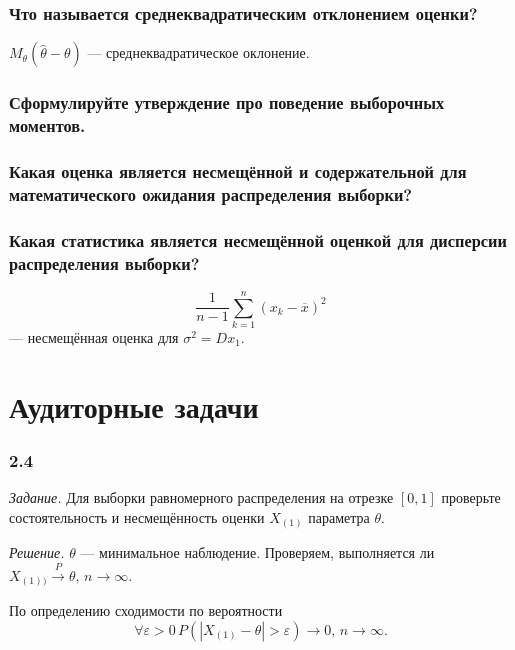 \subsubsection*{Что называется среднеквадратическим отклонением оценки?}

$M_{ \theta } \left( \hat{ \theta } - \theta \right) $ --- среднеквадратическое оклонение.

\subsubsection*{Сформулируйте утверждение про поведение выборочных моментов.}

\subsubsection*{Какая оценка является несмещённой и содержательной для математического ожидания
                распределения выборки?}

\subsubsection*{Какая статистика является несмещённой оценкой для дисперсии распределения выборки?}

$$ \frac{1}{n - 1} \sum \limits_{k = 1}^n \left( x_k - \overline{x} \right)^2$$
--- несмещённая оценка для $ \sigma^2 = Dx_1$.

\section*{Аудиторные задачи}

\subsubsection*{2.4}

\textit{Задание.}
Для выборки равномерного распределения на отрезке $ \left[ 0, 1 \right] $
проверьте состоятельность и несмещённость оценки $X_{ \left( 1 \right) }$ параметра $ \theta $.

\textit{Решение.} $ \theta $ --- минимальное наблюдение.
Проверяем,
выполняется ли $X_{ \left( 1 \right) )} \overset{P}{ \rightarrow } \theta, \, n \to \infty $.

По определению сходимости по вероятности
$$ \forall \varepsilon > 0 \,
  P \left( \left| X_{ \left( 1 \right) } - \theta \right| > \varepsilon \right) \to 0, \,
  n \to \infty.$$

